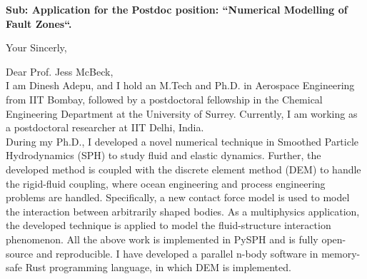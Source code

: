 \documentclass[11pt,a4paper,roman]{moderncv}
\begin{document}
\date{\today}
\opening{\textbf{Sub: Application for the Postdoc position: “Numerical Modelling of Fault Zones“.}}
\closing{Your Sincerly, \vspace{-1em}}


\makelettertitle



Dear Prof. Jess McBeck,
\\
\vspace{1em}
I am Dinesh Adepu, and I hold an M.Tech and Ph.D. in Aerospace
Engineering from IIT Bombay, followed by a postdoctoral fellowship in
the Chemical Engineering Department at the University of
Surrey. Currently, I am working as a postdoctoral researcher at IIT
Delhi, India. \\


\vspace{1em}
During my Ph.D., I developed a novel numerical technique in Smoothed
Particle Hydrodynamics (SPH) to study fluid and elastic dynamics.
Further, the developed method is coupled with the discrete element
method (DEM) to handle the rigid-fluid coupling, where ocean
engineering and process engineering problems are handled.  Specifically, a new contact force
model is used to model the interaction between arbitrarily shaped
bodies. As a multiphysics application, the developed technique is
applied to model the fluid-structure interaction phenomenon. All the
above work is implemented in PySPH and is fully open-source and
reproducible. I have developed a parallel n-body software in
memory-safe Rust programming language, in which DEM is implemented. \\
\end{document}
